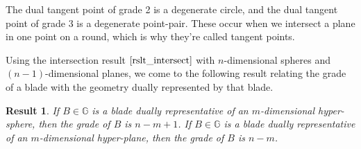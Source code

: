 \documentclass[12pt]{article}
\newcommand{\G}{\mathbb{G}}
\newtheorem{result}{Result}[section]
\begin{document}
The dual tangent point of grade 2 is a degenerate
circle, and the dual tangent point of grade 3 is a degenerate point-pair.
These occur when we intersect a plane in one point on a round,
which is why they're called tangent points.

Using the intersection result $\eqref{rslt_intersect}$ with $n$-dimensional spheres
and $(n-1)$-dimensional planes, we come to the following result relating the grade of a blade
with the geometry dually represented by that blade.
\begin{result}\label{rslt_intersect_grades}
If $B\in\G$ is a blade dually representative of an $m$-dimensional
hyper-sphere, then the grade of $B$ is $n-m+1$.  If $B\in\G$ is a blade
dually representative of an $m$-dimensional hyper-plane, then the
grade of $B$ is $n-m$.
\end{result}
\end{document}
